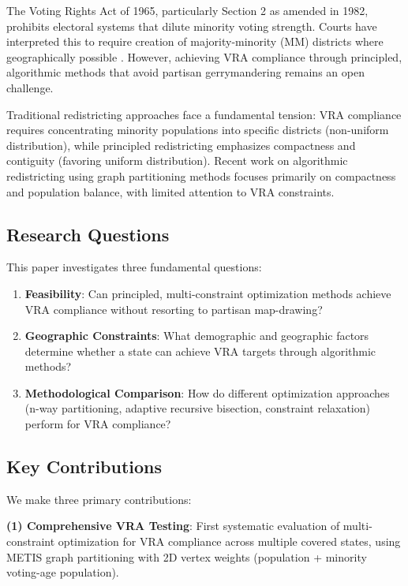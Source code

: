 The Voting Rights Act of 1965, particularly Section 2 as amended in 1982, prohibits electoral systems that dilute minority voting strength. Courts have interpreted this to require creation of majority-minority (MM) districts where geographically possible \citep{thornburg1986, bartlett2009}. However, achieving VRA compliance through principled, algorithmic methods that avoid partisan gerrymandering remains an open challenge.

Traditional redistricting approaches face a fundamental tension: VRA compliance requires concentrating minority populations into specific districts (non-uniform distribution), while principled redistricting emphasizes compactness and contiguity (favoring uniform distribution). Recent work on algorithmic redistricting using graph partitioning methods \citep{dellaLibera2026recursive, duchin2018, deford2021} focuses primarily on compactness and population balance, with limited attention to VRA constraints.

\subsection{Research Questions}

This paper investigates three fundamental questions:

\begin{enumerate}
\item \textbf{Feasibility}: Can principled, multi-constraint optimization methods achieve VRA compliance without resorting to partisan map-drawing?

\item \textbf{Geographic Constraints}: What demographic and geographic factors determine whether a state can achieve VRA targets through algorithmic methods?

\item \textbf{Methodological Comparison}: How do different optimization approaches (n-way partitioning, adaptive recursive bisection, constraint relaxation) perform for VRA compliance?
\end{enumerate}

\subsection{Key Contributions}

We make three primary contributions:

\textbf{(1) Comprehensive VRA Testing}: First systematic evaluation of multi-constraint optimization for VRA compliance across multiple covered states, using METIS graph partitioning with 2D vertex weights (population + minority voting-age population).

